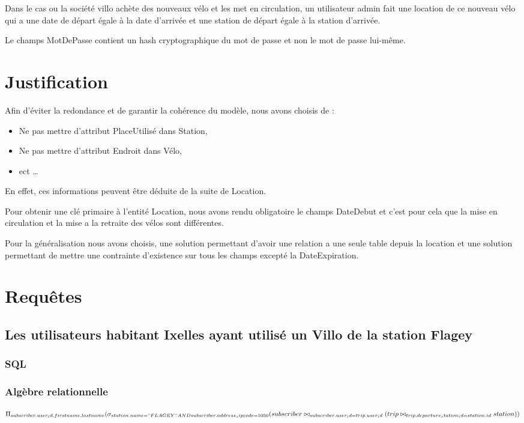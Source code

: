 \documentclass[a4paper,10pt]{article}
\begin{document}
Dans le cas ou la société villo achète des nouveaux vélo et les met en circulation, un utilisateur admin fait une location de ce nouveau vélo qui a une date de départ égale à la date d'arrivée et une station de départ égale à la station d'arrivée.

Le champs MotDePasse contient un hash cryptographique du mot de passe et non le mot de passe lui-m\^eme.

\section{Justification}

Afin d'éviter la redondance et de garantir la cohérence du modèle, nous avons choisis de :
\begin{itemize}
  \item Ne pas mettre d'attribut PlaceUtilisé dans Station,
  \item Ne pas mettre d'attribut Endroit dans Vélo,
  \item ect \ldots
\end{itemize}
En effet, ces informations peuvent être déduite de la suite de Location.

Pour obtenir une clé primaire à l'entité Location, nous avons rendu obligatoire le champs DateDebut et c'est pour cela que la mise en circulation et la mise a la retraite des vélos sont différentes.

Pour la généralisation nous avons choisis, une solution permettant d'avoir une relation a une seule table depuis la location et une solution permettant de mettre une contrainte d'existence sur tous les champs excepté la DateExpiration. 

\section{Requêtes}

\subsection{Les utilisateurs habitant Ixelles ayant utilisé un Villo de la station Flagey}
\subsubsection{SQL}

\subsubsection{Algèbre relationnelle}
\begin{displaymath}
\Pi_{subscriber.user_id, firstname, lastname}(\sigma_{station.name="FLAGEY" AND subscriber.address_zipcode=1050}(subscriber \bowtie_{subscriber.user_id = trip.user_id} (trip \bowtie_{trip.departure_station_id = station.id} station))
\end{displaymath}
\end{document}
